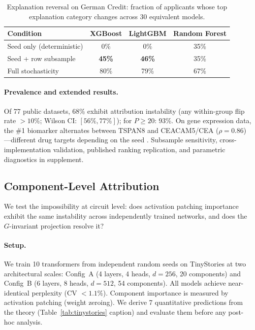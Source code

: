 \documentclass{article}
\begin{document}
\begin{table}[t]
\centering
\caption{Explanation reversal on German Credit: fraction of applicants whose top explanation category changes across 30 equivalent models.}
\label{tab:clinical}
\small
\begin{tabular}{@{}lccc@{}}
\toprule
Condition & XGBoost & LightGBM & Random Forest \\
\midrule
Seed only (deterministic) & 0\% & 0\% & 35\% \\
Seed + row subsample & \textbf{45\%} & \textbf{46\%} & 35\% \\
Full stochasticity & 80\% & 79\% & 67\% \\
\bottomrule
\end{tabular}
\end{table}

\paragraph{Prevalence and extended results.}
Of 77 public datasets, 68\% exhibit attribution instability (any within-group flip rate $> 10\%$; Wilson CI: $[56\%, 77\%]$); for $P \geq 20$: 93\%. On gene expression data, the \#1 biomarker alternates between TSPAN8 and CEACAM5/CEA ($\rho = 0.86$)---different drug targets depending on the seed \citep[see][for full analysis]{anonymous2026attribution}. Subsample sensitivity, cross-implementation validation, published ranking replication, and parametric diagnostics in supplement.

\subsection{Component-Level Attribution}
\label{sec:component-experiments}

We test the impossibility at circuit level: does activation patching importance exhibit the same instability across independently trained networks, and does the $G$-invariant projection resolve it?

\paragraph{Setup.}
We train 10 transformers from independent random seeds on TinyStories \citep{eldan2023tinystories} at two architectural scales: Config~A (4 layers, 4 heads, $d{=}256$, 20 components) and Config~B (6 layers, 8 heads, $d{=}512$, 54 components). All models achieve near-identical perplexity (CV $< 1.1\%$). Component importance is measured by activation patching (weight zeroing). We derive 7 quantitative predictions from the theory (Table~\ref{tab:tinystories} caption) and evaluate them before any post-hoc analysis.
\end{document}
